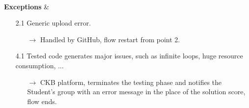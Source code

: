 \documentclass{article}
\begin{document}
{\begin{enumerate}
\begin{xltabular}{\textwidth}
                         \\
                        \hline
                        \textbf{Exceptions} &    \begin{itemize}
                                                    \item[2.1] Generic upload error. 
                                                    \begin{itemize}
                                                        \item[$\rightarrow$] Handled by GitHub, flow restart from point 2.
                                                    \end{itemize} 
                                                    \item[4.1] Tested code generates major issues, such as infinite loops,
                                                    huge resource consumption, ...
                                                    \begin{itemize}
                                                        \item[$\rightarrow$] CKB platform, terminates the testing phase and
                                                        notifies the Student's group with an error message in the place of the 
                                                        solution score, flow ends.
                                                    \end{itemize} 
                                                \end{itemize}
                    \end{xltabular}
                    

\end{enumerate}}
\end{document}
